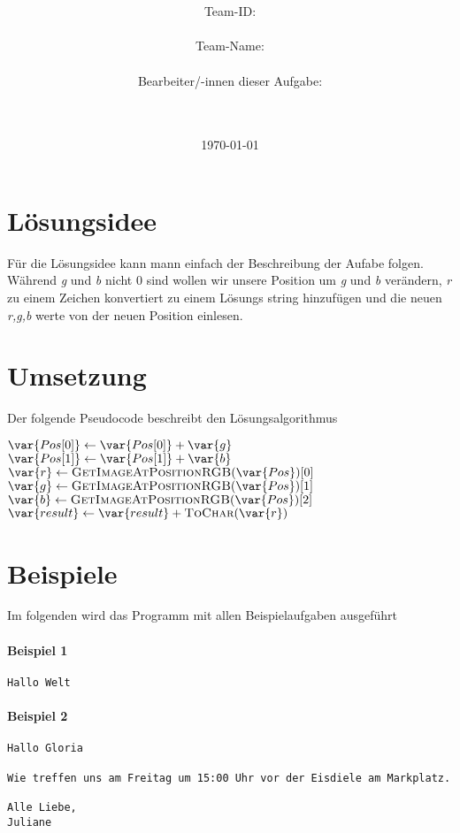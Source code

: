 \documentclass[a4paper,10pt,ngerman]{scrartcl}
\title{\textbf{\Huge\Aufgabe}}
\author{\LARGE Team-ID: \LARGE \TeamId \\\\
	    \LARGE Team-Name: \LARGE \TeamName \\\\
	    \LARGE Bearbeiter/-innen dieser Aufgabe: \\ 
	    \LARGE \Namen\\\\}
\date{\LARGE\today}
\begin{document}
\maketitle
\tableofcontents

\vspace{0.5cm}


\section{Lösungsidee}
\label{Lösungsidee}\label{sec:loesungsidee}
Für die Lösungsidee kann mann einfach der Beschreibung der Aufabe folgen.
Während \emph{g} und \emph{b} nicht 0 sind wollen wir unsere Position um \emph{g} und \emph{b} verändern, \emph{r} zu einem Zeichen konvertiert zu einem Lösungs string hinzufügen und die neuen \emph{r,g,b} werte von der neuen Position einlesen.

\section{Umsetzung}\label{sec:umsetzung}
Der folgende Pseudocode beschreibt den Lösungsalgorithmus
\begin{algorithmic}
  \State $\var{Pos[0]} \gets \var{Pos[0]} + \var{g}$
  \State $\var{Pos[1]} \gets \var{Pos[1]} + \var{b}$
  \State $\var{r} \gets \Call{GetImageAtPositionRGB}{\var{Pos}}[0]$
  \State $\var{g} \gets \Call{GetImageAtPositionRGB}{\var{Pos}}[1]$
  \State $\var{b} \gets \Call{GetImageAtPositionRGB}{\var{Pos}}[2]$
  \State $\var{result} \gets \var{result} + \Call{ToChar}{\var{r}}$
  \EndWhile
\end{algorithmic}

\clearpage
\section{Beispiele}
Im folgenden wird das Programm mit allen Beispielaufgaben ausgeführt
\paragraph{Beispiel 1}\mbox{}
\begin{lstlisting}[frame=tb]
Hallo Welt
\end{lstlisting}
\paragraph{Beispiel 2}\mbox{}
\begin{lstlisting}[frame=tb]
Hallo Gloria

Wie treffen uns am Freitag um 15:00 Uhr vor der Eisdiele am Markplatz.

Alle Liebe,
Juliane
\end{lstlisting}
\end{document}
